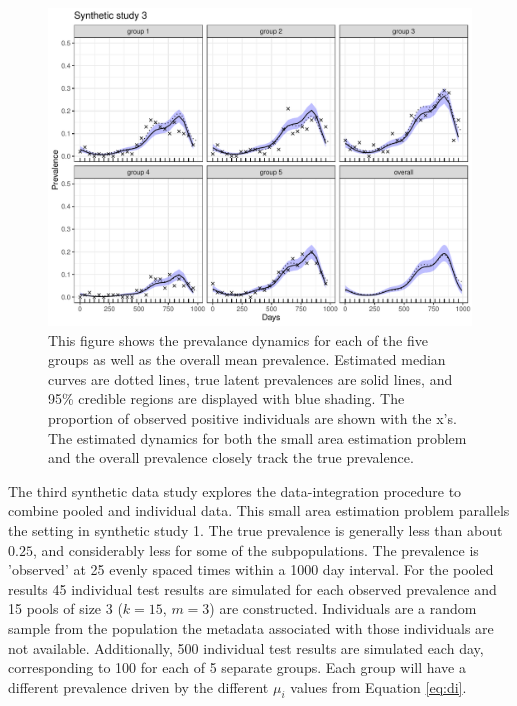 \documentclass{article}
\begin{document}
\begin{figure}[h!]
\centerline{\includegraphics[width=.8\textwidth]{Figure5.pdf}}
\caption{This figure shows the prevalance dynamics for each of the five groups as well as the overall mean prevalence. Estimated median curves are dotted lines, true latent prevalences are solid lines, and 95\% credible regions are displayed with blue shading. The proportion of observed positive individuals are shown with the x's. The estimated dynamics for both the small area estimation problem and the overall prevalence closely track the true prevalence. \label{syn3}}
\end{figure}

The third synthetic data study explores the data-integration procedure to combine pooled and individual data. This small area estimation problem parallels the setting in synthetic study 1. The true prevalence is generally less than about $0.25$, and considerably less for some of the subpopulations. The prevalence is 'observed' at 25 evenly spaced times within a 1000 day interval. For the pooled results 45 individual test results are simulated for each observed prevalence and 15 pools of size 3 ($k=15$, $m=3$) are constructed. Individuals are a random sample from the population the metadata associated with those individuals are not available. Additionally, 500 individual test results are simulated each day, corresponding to 100 for each of 5 separate groups. Each group will have a different prevalence driven by the different $\mu_i$ values from Equation \ref{eq:di}.
\end{document}
